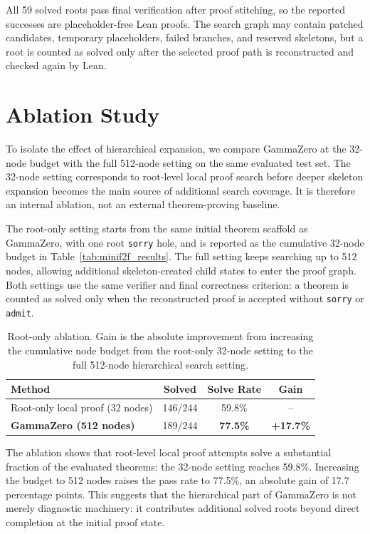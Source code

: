 All 59 solved roots pass final verification after proof stitching, so the reported
successes are placeholder-free Lean proofs. The search graph may contain patched candidates, temporary
placeholders, failed branches, and reserved skeletons, but a root is counted as solved only after the
selected proof path is reconstructed and checked again by Lean.

\section{Ablation Study}

To isolate the effect of hierarchical expansion, we compare GammaZero at the 32-node budget with the
full 512-node setting on the same evaluated test set. The 32-node setting corresponds to root-level
local proof search before deeper skeleton expansion becomes the main source of additional search
coverage. It is therefore an internal ablation, not an external theorem-proving baseline.

The root-only setting starts from the same initial theorem scaffold as GammaZero, with one root
\texttt{sorry} hole, and is reported as the cumulative 32-node budget in Table~\ref{tab:minif2f_results}.
The full setting keeps searching up to 512 nodes, allowing additional skeleton-created child states to
enter the proof graph. Both settings use the same verifier and final correctness criterion: a theorem is
counted as solved only when the reconstructed proof is accepted without \texttt{sorry} or \texttt{admit}.

\begin{table}[h]
\centering
\small
\begin{tabular}{@{}lccc@{}}
\toprule
Method & Solved & Solve Rate & Gain \\
\midrule
Root-only local proof (32 nodes) & 146/244 & 59.8\% & -- \\
\textbf{GammaZero (512 nodes)} & 189/244 & \textbf{77.5\%} & \textbf{+17.7\%} \\
\bottomrule
\end{tabular}
\caption{Root-only ablation. Gain is the absolute improvement from increasing the cumulative node budget from the root-only 32-node setting to the full 512-node hierarchical search setting.}
\label{tab:root-only-ablation}
\end{table}

The ablation shows that root-level local proof attempts solve a substantial fraction of the evaluated
theorems: the 32-node setting reaches 59.8\%. Increasing the budget to 512 nodes raises the pass rate
to 77.5\%, an absolute gain of 17.7 percentage points. This suggests that the hierarchical part of
GammaZero is not merely diagnostic machinery: it contributes additional solved roots beyond direct
completion at the initial proof state.

